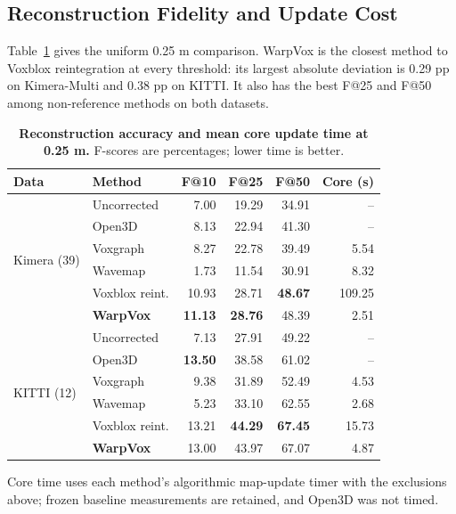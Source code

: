 \subsection{Reconstruction Fidelity and Update Cost}

Table~\ref{tab:broad_main} gives the uniform 0.25 m comparison. WarpVox is
the closest method to Voxblox reintegration at every threshold: its largest
absolute deviation is 0.29 pp on Kimera-Multi and 0.38 pp on KITTI. It also has
the best F@25 and F@50 among non-reference methods on both datasets.

\begin{table}[t]
\centering
\caption{\textbf{Reconstruction accuracy and mean core update time at
0.25 m.} F-scores are percentages; lower time is better.}
\label{tab:broad_main}
\scriptsize
\setlength{\tabcolsep}{1.7pt}
\begin{tabular}{llrrrr}
\toprule
Data & Method & F@10 & F@25 & F@50 & Core (s) \\
\midrule
\multirow{6}{*}{Kimera (39)}
 & Uncorrected & 7.00 & 19.29 & 34.91 & -- \\
 & Open3D & 8.13 & 22.94 & 41.30 & -- \\
 & Voxgraph & 8.27 & 22.78 & 39.49 & 5.54 \\
 & Wavemap & 1.73 & 11.54 & 30.91 & 8.32 \\
 & Voxblox reint. & 10.93 & 28.71 & \textbf{48.67} & 109.25 \\
 & \textbf{WarpVox} & \textbf{11.13} & \textbf{28.76} & 48.39 & 2.51 \\
\midrule
\multirow{6}{*}{KITTI (12)}
 & Uncorrected & 7.13 & 27.91 & 49.22 & -- \\
 & Open3D & \textbf{13.50} & 38.58 & 61.02 & -- \\
 & Voxgraph & 9.38 & 31.89 & 52.49 & 4.53 \\
 & Wavemap & 5.23 & 33.10 & 62.55 & 2.68 \\
 & Voxblox reint. & 13.21 & \textbf{44.29} & \textbf{67.45} & 15.73 \\
 & \textbf{WarpVox} & 13.00 & 43.97 & 67.07 & 4.87 \\
\bottomrule
\end{tabular}
\vspace{1pt}

\parbox{\columnwidth}{\scriptsize Core time uses each method's algorithmic
map-update timer with the exclusions above; frozen baseline measurements are
retained, and Open3D was not timed.}
\end{table}

